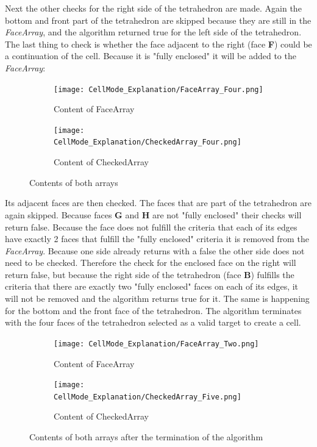 \documentclass{report}
\begin{document}
		\noindent Next the other checks for the right side of the tetrahedron are made. Again the bottom and front part of the tetrahedron are skipped because they are still in the \textit{FaceArray}, and the algorithm returned true for the left side of the tetrahedron. The last thing to check is whether the face adjacent to the right (face \textbf{F}) could be a continuation of the cell. Because it is "fully enclosed" it will be added to the \textit{FaceArray}:
		\begin{figure}[H]
			\centering
			\begin{subfigure}[H]{2.5in}
				\centering
				\texttt{[image: CellMode\_Explanation/FaceArray\_Four.png]}
				\caption{Content of FaceArray}
				\label{pic:pic5.7.a}
			\end{subfigure}
			\quad
			\begin{subfigure}[H]{2.5in}
				\centering
				\texttt{[image: CellMode\_Explanation/CheckedArray\_Four.png]}
				\caption{Content of CheckedArray}
				\label{pic:pic5.7.b}
			\end{subfigure}
			\caption{Contents of both arrays}
			\label{pic:pic5.7}
		\end{figure}
		\noindent Its adjacent faces are then checked. The faces that are part of the tetrahedron are again skipped. Because faces \textbf{G} and \textbf{H} are not "fully enclosed" their checks will return false. Because the face does not fulfill the criteria that each of its edges have exactly 2 faces that fulfill the "fully enclosed" criteria it is removed from the \textit{FaceArray}. Because one side already returns with a false the other side does not need to be checked. Therefore the check for the enclosed face on the right will return false, but because the right side of the tetrahedron (face \textbf{B}) fulfills the criteria that there are exactly two "fully enclosed" faces on each of its edges, it will not be removed and the algorithm returns true for it. The same is happening for the bottom and the front face of the tetrahedron. The algorithm terminates with the four faces of the tetrahedron selected as a valid target to create a cell.
		\begin{figure}[H]
			\centering
			\begin{subfigure}[H]{2.5in}
				\centering
				\texttt{[image: CellMode\_Explanation/FaceArray\_Two.png]}
				\caption{Content of FaceArray}
				\label{pic:pic5.8.a}
			\end{subfigure}
			\quad
			\begin{subfigure}[H]{2.5in}
				\centering
				\texttt{[image: CellMode\_Explanation/CheckedArray\_Five.png]}
				\caption{Content of CheckedArray}
				\label{pic:pic5.8.b}
			\end{subfigure}
			\caption{Contents of both arrays after the termination of the algorithm}
			\label{pic:pic5.8}
		\end{figure}
	\closesection
	
\end{document}
